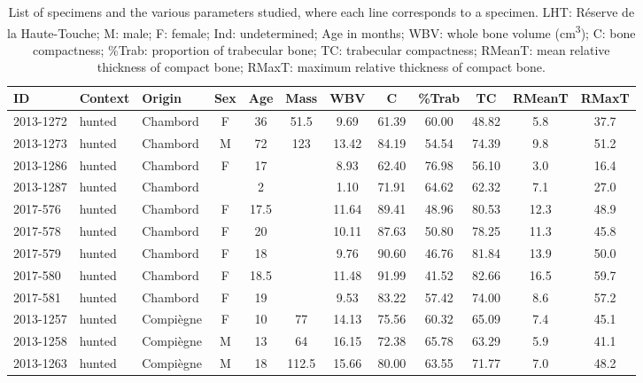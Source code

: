 \documentclass[12pt,a4paper]{article}
\begin{document}
\begin{landscape}
\begin{table}[!htbp]
    \centering
    \footnotesize
    \setlength{\tabcolsep}{3pt}  %
    \renewcommand{\arraystretch}{0.05}  %
    \caption{List of specimens and the various parameters studied, where each line corresponds to a specimen. LHT: Réserve de la Haute-Touche; M: male; F: female; Ind: undetermined; Age in months; WBV: whole bone volume (\si{\centi\meter\cubed}); C: bone compactness; \%Trab: proportion of trabecular bone; TC: trabecular compactness; RMeanT: mean relative thickness of compact bone; RMaxT: maximum relative thickness of compact bone.}
    \label{tab:data_boar}
    \footnotesize
    \begin{tabular}{@{}lllccccccccc@{}}
    \toprule
    ID & Context & Origin & Sex & Age & Mass & WBV & C & \%Trab & TC & RMeanT & RMaxT \\
    \midrule
    2013-1272 & hunted & Chambord & F & 36 & 51.5 & 9.69 & 61.39 & 60.00 & 48.82 & 5.8 & 37.7 \\
    2013-1273 & hunted & Chambord & M & 72 & 123 & 13.42 & 84.19 & 54.54 & 74.39 & 9.8 & 51.2 \\
    2013-1286 & hunted & Chambord & F & 17 & ~ & 8.93 & 62.40 & 76.98 & 56.10 & 3.0 & 16.4 \\
    2013-1287 & hunted & Chambord & ~ & 2 & ~ & 1.10 & 71.91 & 64.62 & 62.32 & 7.1 & 27.0 \\
    2017-576 & hunted & Chambord & F & 17.5 & ~ & 11.64 & 89.41 & 48.96 & 80.53 & 12.3 & 48.9 \\
    2017-578 & hunted & Chambord & F & 20 & ~ & 10.11 & 87.63 & 50.80 & 78.25 & 11.3 & 45.8 \\
    2017-579 & hunted & Chambord & F & 18 & ~ & 9.76 & 90.60 & 46.76 & 81.84 & 13.9 & 50.0 \\
    2017-580 & hunted & Chambord & F & 18.5 & ~ & 11.48 & 91.99 & 41.52 & 82.66 & 16.5 & 59.7 \\
    2017-581 & hunted & Chambord & F & 19 & ~ & 9.53 & 83.22 & 57.42 & 74.00 & 8.6 & 57.2 \\
    2013-1257 & hunted & Compiègne & F & 10 & 77 & 14.13 & 75.56 & 60.32 & 65.09 & 7.4 & 45.1 \\
    2013-1258 & hunted & Compiègne & M & 13 & 64 & 16.15 & 72.38 & 65.78 & 63.29 & 5.9 & 41.1 \\
    2013-1263 & hunted & Compiègne & M & 18 & 112.5 & 15.66 & 80.00 & 63.55 & 71.77 & 7.0 & 48.2 \\

\end{tabular}
\end{table}
\end{landscape}
\end{document}
